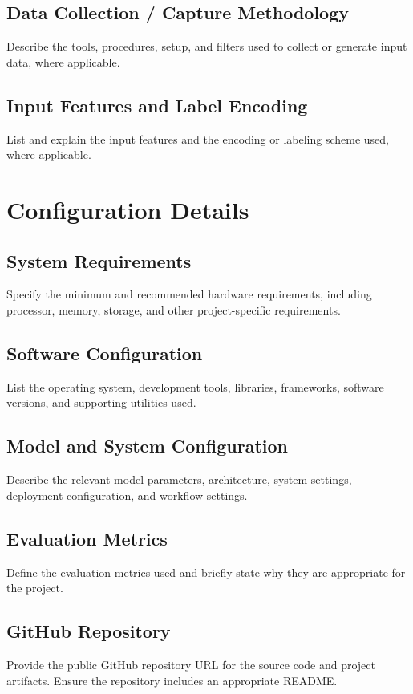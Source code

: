 \begin{appendices}
\section{Data Collection / Capture Methodology}
Describe the tools, procedures, setup, and filters used to collect or generate input data, where applicable.

\section{Input Features and Label Encoding}
List and explain the input features and the encoding or labeling scheme used, where applicable.

\chapter{Configuration Details}
\section{System Requirements}
Specify the minimum and recommended hardware requirements, including processor, memory, storage, and other project-specific requirements.

\section{Software Configuration}
List the operating system, development tools, libraries, frameworks, software versions, and supporting utilities used.

\section{Model and System Configuration}
Describe the relevant model parameters, architecture, system settings, deployment configuration, and workflow settings.

\section{Evaluation Metrics}
Define the evaluation metrics used and briefly state why they are appropriate for the project.

\section{GitHub Repository}
Provide the public GitHub repository URL for the source code and project artifacts. Ensure the repository includes an appropriate README.


\end{appendices}
